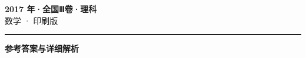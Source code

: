 \documentclass[zihao=5, a4paper]{ctexart}
\begin{document}
\begin{center}
  {\Large\bfseries 2017 年·全国Ⅲ卷·理科}\\[4pt]
  {\large 数学 · 印刷版}
\end{center}
\medskip
{}

\par\bigskip\hrule\bigskip
{}
\begin{center}{\large\bfseries 参考答案与详细解析}\end{center}
\smallskip

\end{document}
